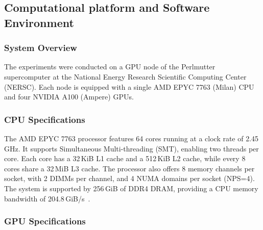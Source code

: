\subsection{Computational platform and Software Environment}
\label{subsec:computational-platform-and-software-environment}







\subsubsection{System Overview}

The experiments were conducted on a GPU node of the Perlmutter supercomputer at the National Energy Research Scientific Computing Center (NERSC). Each node is equipped with a single AMD EPYC 7763 (Milan) CPU and four NVIDIA A100 (Ampere) GPUs.

\subsubsection{CPU Specifications}

The AMD EPYC 7763 processor features 64 cores running at a clock rate of 2.45\,GHz. It supports Simultaneous Multi-threading (SMT), enabling two threads per core. Each core has a 32\,KiB L1 cache and a 512\,KiB L2 cache, while every 8 cores share a 32\,MiB L3 cache. The processor also offers 8 memory channels per socket, with 2 DIMMs per channel, and 4 NUMA domains per socket (NPS=4). The system is supported by 256\,GiB of DDR4 DRAM, providing a CPU memory bandwidth of 204.8\,GiB/s~\cite{nersc_perlmutter_architecture, amd_epyc_tuning_guide}.

\subsubsection{GPU Specifications}

